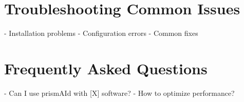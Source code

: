 \chapter{Troubleshooting Common Issues} \label{chap:troubleshooting}
- Installation problems  
- Configuration errors  
- Common fixes  

\chapter{Frequently Asked Questions} \label{chap:faq}
- Can I use prismAId with [X] software?  
- How to optimize performance?  